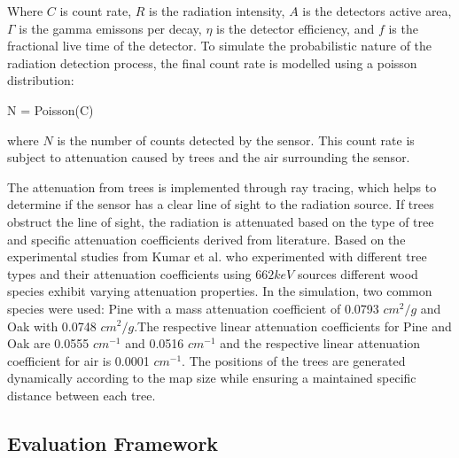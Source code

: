 \documentclass[../report.tex]{subfiles}
\begin{document}
    Where $C$ is count rate, $R$ is the radiation intensity, $A$ is the detectors active area, $\Gamma$ is the gamma emissons per decay, $\eta$ is the detector efficiency, and 
    $f$ is the fractional live time of the detector. To simulate the probabilistic nature of the radiation detection process, the final count rate is modelled using
    a poisson distribution:

    N = Poisson(C)

    where $N$ is the number of counts detected by the sensor. This count rate is subject to attenuation caused by trees and the air surrounding the sensor.

    The attenuation from trees is implemented through ray tracing, which helps to determine if the sensor has a clear line of sight to the radiation source.  If 
    trees obstruct the line of sight, the radiation is attenuated based on the type of tree and specific attenuation coefficients derived from literature. 
    Based on the experimental studies from Kumar et al. \cite{kumar2021measurement} who experimented with different tree types and their attenuation coefficients using $662 keV$ sources
    different wood species exhibit varying attenuation properties. In the simulation, two common species were used: Pine with a mass attenuation coefficient of 
    0.0793 $cm^{2}/g$ and Oak with 0.0748 $cm^{2}/g$.The respective linear attenuation coefficients for Pine and Oak are 0.0555 $cm^{-1}$ and 0.0516 $cm^{-1}$ and 
    the respective linear attenuation coefficient for air is 0.0001 $cm^{-1}$.
    The positions of the trees are generated dynamically according to the map size while ensuring a 
    maintained specific distance between each tree.
        



    \subsection{Evaluation Framework}
\end{document}
